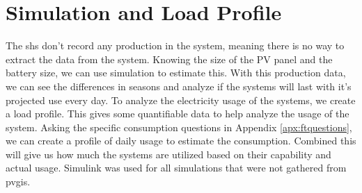 \section{Simulation and Load Profile}
The \acrshort{shs} don't record any production in the system, meaning there is no way to extract the data from the system. Knowing the size of the PV panel and the battery size, we can use simulation to estimate this. With this production data, we can see the differences in seasons and analyze if the systems will last with it's projected use every day. 
To analyze the electricity usage of the systems, we create a load profile. This gives some quantifiable data to help analyze the usage of the system. Asking the specific consumption questions in Appendix \ref{apx:ftquestions}, we can create a profile of daily usage to estimate the consumption. Combined this will give us how much the systems are utilized based on their capability and actual usage. Simulink was used for all simulations that were not gathered from \acrshort{pvgis}.




